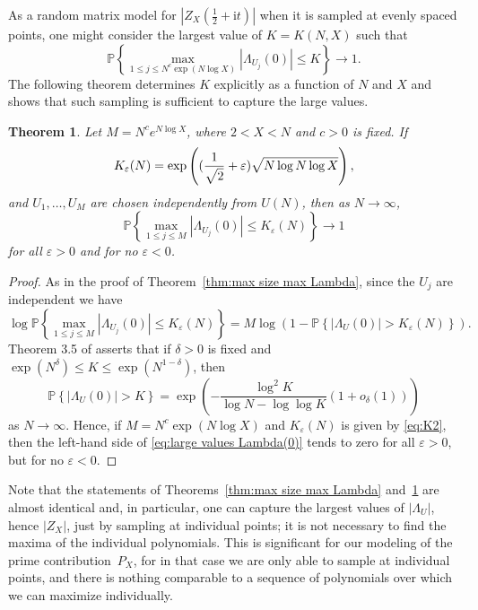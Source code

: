 \documentclass[10pt,reqno,twoside]{amsart}
\renewcommand{\i}{{\mathrm{i}}} %
\newcommand{\Prob}{\mathbb{P}}
\newtheorem{theorem}{Theorem}[section]
\numberwithin{equation}{section}
\numberwithin{theorem}{section}
\begin{document}
{{As a random matrix model for  $|Z_X(\tfrac12+\i t)|$
when it is sampled at evenly spaced points, one might
consider the largest value of $K=K(N, X)$ such that
\begin{equation}
\Prob\left\{ \max_{1\leq j \leq N^c \exp(N\log X)}
|\Lambda_{U_j}(0)| \leq K \right\} \to 1.
\end{equation}
The following theorem determines $K$ explicitly as a function of $N$
and  $X$  and shows that
such sampling is sufficient to capture the large values.
\begin{theorem}\label{thm:max size Lambda}
Let $M=N^c e^{N\log X}$, where $2<X<N$ and $c>0$ is fixed.
If
\begin{equation}\label{eq:K2}
K_\varepsilon(N)=\exp\left(
(\frac{1}{\sqrt{\mathstrut 2}}+\varepsilon) \sqrt{\mathstrut N\log N\log X}
\right),
\end{equation}
and $U_1,\dots,U_M$ are chosen independently from $U(N)$, then as
$N\to\infty$,
\begin{equation}
\Prob\left\{ \max_{1\leq j \leq M} |\Lambda_{U_j}(0)| \leq
K_\varepsilon(N) \right\} \to 1
\end{equation}
for all $\varepsilon>0$ and for no $\varepsilon<0$.
\end{theorem}

\begin{proof}
As in the proof of Theorem~\ref{thm:max size max Lambda}, since the $U_j$ are independent we have
\begin{equation}\label{eq:large values Lambda(0)}
\log \Prob\left\{ \max_{1\leq j \leq M} |\Lambda_{U_j}(0)| \leq
K_\varepsilon(N) \right\} = M
\log\left(1-\Prob\left\{|\Lambda_{U}(0)| > K_\varepsilon(N)
\right\} \right) .
\end{equation}
Theorem 3.5 of \cite{HKO2} asserts that if $\delta>0$ is fixed  and
$\exp(N^\delta) \leq K \leq \exp(N^{1-\delta})$, then
\begin{equation}\label{eq:LDP Lambda}
\Prob\left\{ |\Lambda_{U}(0)| > K \right\} =
\exp\left(-\frac{\log^2 K}{ \log N - \log\log K}
(1+o_\delta(1))\right)
\end{equation}
as $N\to\infty$. Hence,  if $M=N^c \exp(N \log X)$
and $K_\varepsilon(N)$ is given by \eqref{eq:K2}, then the
left-hand side  of \eqref{eq:large
values Lambda(0)} tends to zero for all $\varepsilon>0$, but for
no $\varepsilon<0$.
\end{proof}


Note that the statements of Theorems~\ref{thm:max size max Lambda}
and~\ref{thm:max size Lambda} are almost identical and, in
particular, one can capture the largest values of $|\Lambda_U|$,
hence $|Z_X|$, just by sampling at individual points; it is  not
necessary to find the maxima of the individual polynomials.
This is significant for our modeling of the prime
contribution~$P_X$, for in that case we are only able to sample at
individual points, and there is nothing comparable to a sequence
of polynomials over which we can maximize individually.


}}
\end{document}
